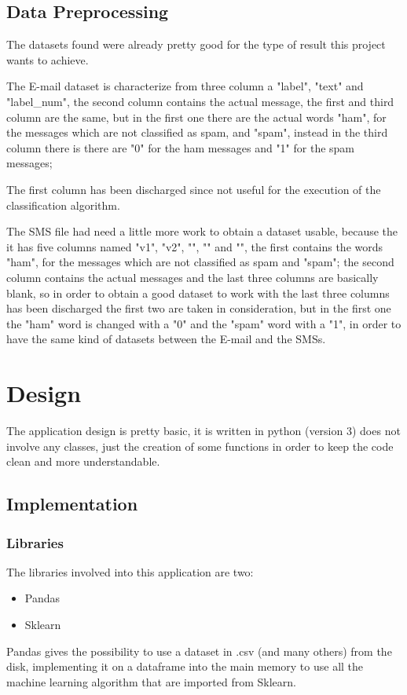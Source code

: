 \documentclass[a4paper]{report}
\begin{document}
\section{Data Preprocessing}
The datasets found were already pretty good for the type of result this project wants to achieve.

\noindent The E-mail dataset is characterize from three column a "label", "text" and "label\_num", the second column contains the actual message, the first and third column are the same, but in the first one there are the actual words "ham", for the messages which are not classified as spam, and "spam",  instead in the third column there is there are "0" for the ham messages and "1" for the spam messages;

\noindent The first column has been discharged since not useful for the execution of the classification algorithm.

\noindent The SMS file had need a little more work to obtain a dataset usable, because the it has five columns named "v1", "v2", "", "" and "", the first contains the words "ham", for the messages which are not classified as spam and "spam"; the second column contains the actual messages and the last three columns are basically blank, so in order to obtain a good dataset to work with the last three columns has been discharged the first two are taken in consideration, but in the first one the "ham" word is changed with a "0" and the "spam" word with a "1", in order to have the same kind of datasets between the E-mail and the SMSs.

\chapter{Design}
The application design is pretty basic, it is written in python (version 3) does not involve any classes, just the creation of some functions in order to keep the code clean and more understandable.
\section{Implementation}
\subsection{Libraries}
The libraries involved into this application are two:
\begin{itemize}
	\item Pandas
	\item Sklearn
\end{itemize}
Pandas gives the possibility to use a dataset in .csv (and many others) from the disk, implementing it on a dataframe into the main memory to use all the machine learning algorithm that are imported from Sklearn.
\end{document}
